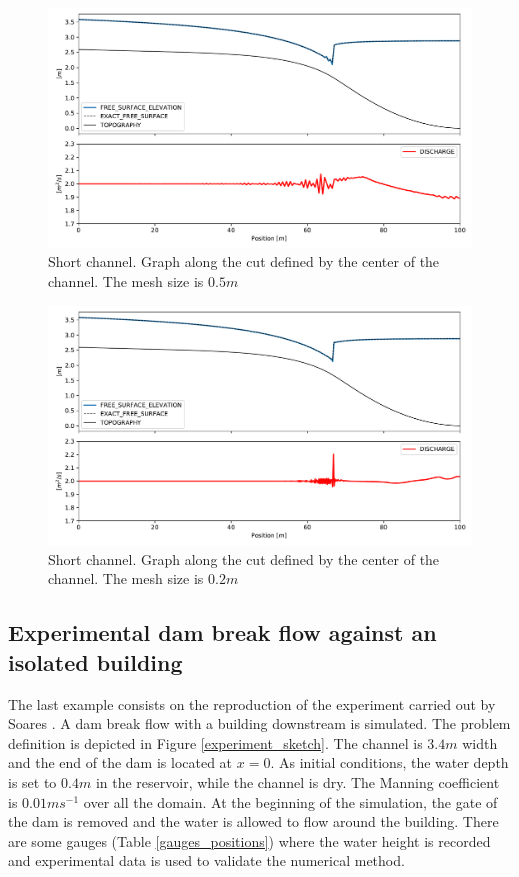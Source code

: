 \documentclass[a4paper,12pt]{article}
\begin{document}
\begin{figure}
    \centering
    \includegraphics[width=\textwidth]{img/jump/mesh_0.5.pdf}
    \caption{Short channel. Graph along the cut defined by the center of the channel. The mesh size is $0.5m$}
    \label{mac_donald_shock_graph_5}
\end{figure}

\begin{figure}
    \centering
    \includegraphics[width=\textwidth]{img/jump/mesh_0.2.pdf}
    \caption{Short channel. Graph along the cut defined by the center of the channel. The mesh size is $0.2m$}
    \label{mac_donald_shock_graph_2}
\end{figure}


\subsection{Experimental dam break flow against an isolated building}

The last example consists on the reproduction of the experiment carried out by Soares \cite{soares2007}.
A dam break flow with a building downstream is simulated. The problem definition is depicted in Figure \ref{experiment_sketch}. The channel is $3.4m$ width and the end of the dam is located at $x=0$.
As initial conditions, the water depth is set to $0.4m$ in the reservoir, while the channel is dry. The Manning coefficient is $0.01ms^{-1}$ over all the domain.
At the beginning of the simulation, the gate of the dam is removed and the water is allowed to flow around the building.
There are some gauges (Table \ref{gauges_positions}) where the water height is recorded and experimental data is used to validate the numerical method.
\end{document}
